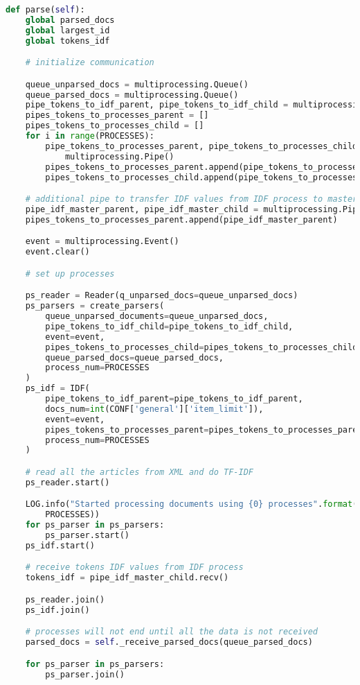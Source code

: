 \begin{lstlisting}[language=Python, caption={Main.parse() - Main process method for conducting document parsing}, label={lst:main:parse}]
def parse(self):
    global parsed_docs
    global largest_id
    global tokens_idf

    # initialize communication

    queue_unparsed_docs = multiprocessing.Queue()
    queue_parsed_docs = multiprocessing.Queue()
    pipe_tokens_to_idf_parent, pipe_tokens_to_idf_child = multiprocessing.Pipe()
    pipes_tokens_to_processes_parent = []
    pipes_tokens_to_processes_child = []
    for i in range(PROCESSES):
        pipe_tokens_to_processes_parent, pipe_tokens_to_processes_child = \
            multiprocessing.Pipe()
        pipes_tokens_to_processes_parent.append(pipe_tokens_to_processes_parent)
        pipes_tokens_to_processes_child.append(pipe_tokens_to_processes_child)

    # additional pipe to transfer IDF values from IDF process to master
    pipe_idf_master_parent, pipe_idf_master_child = multiprocessing.Pipe()
    pipes_tokens_to_processes_parent.append(pipe_idf_master_parent)

    event = multiprocessing.Event()
    event.clear()

    # set up processes

    ps_reader = Reader(q_unparsed_docs=queue_unparsed_docs)
    ps_parsers = create_parsers(
        queue_unparsed_documents=queue_unparsed_docs,
        pipe_tokens_to_idf_child=pipe_tokens_to_idf_child,
        event=event,
        pipes_tokens_to_processes_child=pipes_tokens_to_processes_child,
        queue_parsed_docs=queue_parsed_docs,
        process_num=PROCESSES
    )
    ps_idf = IDF(
        pipe_tokens_to_idf_parent=pipe_tokens_to_idf_parent,
        docs_num=int(CONF['general']['item_limit']),
        event=event,
        pipes_tokens_to_processes_parent=pipes_tokens_to_processes_parent,
        process_num=PROCESSES
    )

    # read all the articles from XML and do TF-IDF
    ps_reader.start()

    LOG.info("Started processing documents using {0} processes".format(
        PROCESSES))
    for ps_parser in ps_parsers:
        ps_parser.start()
    ps_idf.start()

    # receive tokens IDF values from IDF process
    tokens_idf = pipe_idf_master_child.recv()

    ps_reader.join()
    ps_idf.join()

    # processes will not end until all the data is not received
    parsed_docs = self._receive_parsed_docs(queue_parsed_docs)

    for ps_parser in ps_parsers:
        ps_parser.join()
\end{lstlisting}

